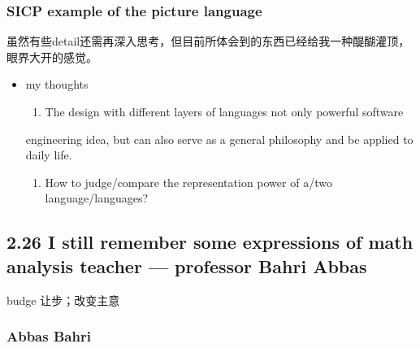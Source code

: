 \documentclass[11pt]{article}
\begin{document}
\subsubsection*{SICP example of the picture language}
\label{sec:orgheadline116}
虽然有些detail还需再深入思考，但目前所体会到的东西已经给我一种醍醐灌顶，眼界大开的感觉。
\begin{itemize}
\item my thoughts
\label{sec:orgheadline115}
\begin{enumerate}
\item The design with different layers of languages not only powerful software
\end{enumerate}
engineering idea, but can also serve as a general philosophy and be applied to
daily life.
\begin{enumerate}
\item How to judge/compare the representation power of a/two language/languages?
\end{enumerate}
\end{itemize}
\subsection*{2.26 I still remember some expressions of math analysis teacher --- professor \textbf{Bahri Abbas}}
\label{sec:orgheadline122}
budge 让步；改变主意
\subsubsection*{Abbas Bahri}
\label{sec:orgheadline121}
\end{document}
